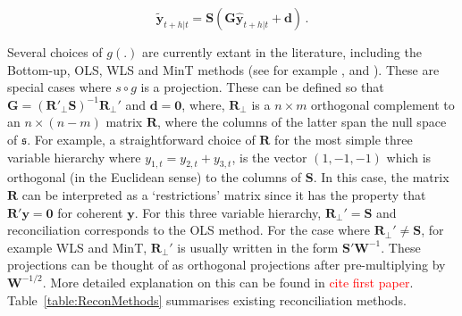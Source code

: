 \documentclass[12pt]{article}
\theoremstyle{definition}
\begin{document}
	\begin{equation} \label{eq:ReconPoint}
	  \tilde{\bm{y}}_{t+h|t}=\bm{S}(\bm{G}\hat{\bm{y}}_{t+h|t}+\bm{d})\,.
	\end{equation}


Several choices of $g(.)$ are currently extant in the literature, including the Bottom-up, OLS, WLS and MinT methods (see for example \citep{Dunn1976}, \citet{Hyndman2011} and \citet{WicEtAl2019}). These are special cases where $s\circ g$ is a projection. These can be defined so that $\bm{G}=({\bm{R}'_{\perp}}\bm{S})^{-1}\bm{R}_{\perp}'$ and $\bm{d}=\bm{0}$, where, ${\bm{R}_{\perp}}$ is a $n\times m$ orthogonal complement to an $n \times (n-m)$ matrix $\bm{R}$, where the columns of the latter span the null space of $\mathfrak{s}$. For example, a straightforward choice of $\bm{R}$ for the most simple three variable hierarchy where $y_{1,t}=y_{2,t}+y_{3,t}$, is the vector $(1,-1,-1)$ which is orthogonal (in the Euclidean sense) to the columns of $\bm{S}$. In this case, the matrix $\bm{R}$ can be interpreted as a `restrictions' matrix since it has the property that $\bm{R}'\bm{y}=\bm{0}$ for coherent $\bm{y}$. For this three variable hierarchy, $\bm{R}_\perp'=\bm{S}$ and reconciliation corresponds to the OLS method. For the case where $\bm{R}_\perp'\neq\bm{S}$, for example WLS and MinT, 
$\bm{R}_\perp'$ is usually written in the form $\bm{S}'{\bm{W}}^{-1}$. These projections can be thought of as orthogonal projections after pre-multiplying by ${\bm{W}^{-1/2}}$. More detailed explanation on this can be found in \textcolor{red}{cite first paper}. Table~\ref{table:ReconMethods} summarises existing reconciliation methods.
\end{document}
